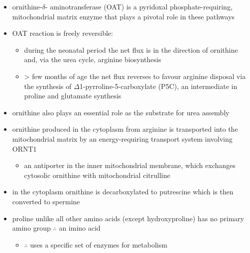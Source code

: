 \documentclass{scrartcl}
\begin{document}
\begin{itemize}
\item ornithine-\(\delta\)- aminotransferase (OAT) is a pyridoxal
phosphate-requiring, mitochondrial matrix enzyme that plays a
pivotal role in these pathways
\item OAT reaction is freely reversible:
\begin{itemize}
\item during the neonatal period the net flux is in the direction of
ornithine and, via the urea cycle, arginine biosynthesis
\item \textgreater{} few months of age the net flux reverses to favour arginine
disposal via the synthesis of \(\Delta\)1-pyrroline-5-carboxylate
(P5C), an intermediate in proline and glutamate synthesis
\end{itemize}
\item ornithine also plays an essential role as the substrate for urea assembly
\item ornithine produced in the cytoplasm from arginine is transported
into the mitochondrial matrix by an energy-requiring transport
system involving ORNT1
\begin{itemize}
\item an antiporter in the inner mitochondrial membrane, which exchanges
cytosolic ornithine with mitochondrial citrulline
\end{itemize}
\item in the cytoplasm ornithine is decarboxylated to putrescine which is
then converted to spermine
\item proline unlike all other amino acids (except hydroxyproline) has
no primary amino group \(\therefore\) an imino acid
\begin{itemize}
\item \(\therefore\) uses a specific set of enzymes for metabolism
\end{itemize}
\end{itemize}

\chemnameinit{}
\end{document}
